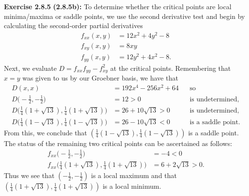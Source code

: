 \documentclass[12pt,oneside]{article}
\newenvironment{exercise}[1]{\vspace{.1in}\noindent\textbf{Exercise #1 \hspace{.05em}}}{}
\begin{document}
\begin{exercise}{2.8.5}
    \bigskip
    \textbf{(2.8.5b):}
    To determine whether the critical points are local minima/maxima or saddle points, we
    use the second derivative test and begin by calculating the second-order partial derivatives 
    \begin{align*}
        f_{xx}(x,y) &= 12x^2+4y^2-8\\
        f_{xy}(x,y) &= 8xy\\
        f_{yy}(x,y) &= 12y^2+4x^2-8.
    \end{align*}
    Next, we evaluate $D=f_{xx}f_{yy}-f_{xy}^2$ at the critical points. Remembering that 
    $x=y$ was given to us by our Groebner basis, we have that 
    \begin{align*}
        D(x,x)  &= 192x^4-256x^2+64 && \text{so}\\
        D\biggr(-\frac{1}{2},-\frac{1}{2}\biggr)    &= 12 > 0   && \text{is undetermined,}\\
        D\biggr(\frac{1}{4}(1+\sqrt{13}),\frac{1}{4}(1+\sqrt{13})\biggr)    &=26+10\sqrt{13} > 0 &&\text{is undetermined,}\\
        D\biggr(\frac{1}{4}(1-\sqrt{13}),\frac{1}{4}(1-\sqrt{13})\biggr)    &=26-10\sqrt{13} < 0 &&\text{is a saddle point.}
    \end{align*}
    From this, we conclude that $(\frac{1}{4}(1-\sqrt{13}),\frac{1}{4}(1-\sqrt{13}))$ is 
    a saddle point. The status of the remaining two critical points can be ascertained as 
    follows:
    \begin{align*}
        f_{xx}\biggr(-\frac{1}{2},-\frac{1}{2}\biggr)   &= -4 < 0\\
        f_{xx}\biggr(\frac{1}{4}(1+\sqrt{13}),\frac{1}{4}(1+\sqrt{13})\biggr)   &= 6+2\sqrt{13} >0.
    \end{align*}
    Thus we see that $(-\frac{1}{2},-\frac{1}{2})$ is a local maximum and that 
    $(\frac{1}{4}(1+\sqrt{13}),\frac{1}{4}(1+\sqrt{13}))$ is a local minimum.
\end{exercise}

\end{document}
